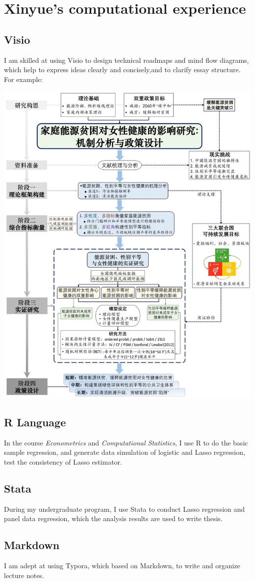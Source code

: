 

\section{Xinyue's computational experience}

\subsection{Visio}
I am skilled at using Visio to design technical roadmaps and mind flow diagrams, which help to express ideas clearly and concisely,and to clarify essay structure.
For example:
\begin{center}
    \includegraphics[scale=0.1]{visio.jpg}
\end{center}

\subsection{R Language}
In the course \textit{Econometrics} and \textit{Computational Statistics}, I use R to do the basic sample regression, and generate data simulation of logistic and Lasso regression, test the consistency of Lasso estimator.

\subsection{Stata}
During my undergraduate program, I use Stata to conduct Lasso regression and panel data regression, which the analysis results are used to write thesis.

\subsection{Markdown}
I am adept at using Typora, which based on Markdown, to write and organize lecture notes.


